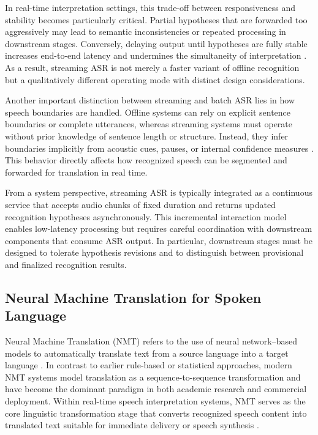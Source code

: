 In real-time interpretation settings, this trade-off between responsiveness and stability becomes particularly critical. Partial hypotheses that are forwarded too aggressively may lead to semantic inconsistencies or repeated processing in downstream stages. Conversely, delaying output until hypotheses are fully stable increases end-to-end latency and undermines the simultaneity of interpretation \cite{grissom2014realtime}. As a result, streaming ASR is not merely a faster variant of offline recognition but a qualitatively different operating mode with distinct design considerations.

Another important distinction between streaming and batch ASR lies in how speech boundaries are handled. Offline systems can rely on explicit sentence boundaries or complete utterances, whereas streaming systems must operate without prior knowledge of sentence length or structure. Instead, they infer boundaries implicitly from acoustic cues, pauses, or internal confidence measures \cite{weller2021streamingST}. This behavior directly affects how recognized speech can be segmented and forwarded for translation in real time.

From a system perspective, streaming ASR is typically integrated as a continuous service that accepts audio chunks of fixed duration and returns updated recognition hypotheses asynchronously. This incremental interaction model enables low-latency processing but requires careful coordination with downstream components that consume ASR output. In particular, downstream stages must be designed to tolerate hypothesis revisions and to distinguish between provisional and finalized recognition results.


\subsection{Neural Machine Translation for Spoken Language}

Neural Machine Translation (NMT) refers to the use of neural network–based models to automatically translate text from a source language into a target language \cite{stahlberg2020nmt_review}. In contrast to earlier rule-based or statistical approaches, modern NMT systems model translation as a sequence-to-sequence transformation and have become the dominant paradigm in both academic research and commercial deployment. Within real-time speech interpretation systems, NMT serves as the core linguistic transformation stage that converts recognized speech content into translated text suitable for immediate delivery or speech synthesis \cite{sperber2020endtoendpromise}.

